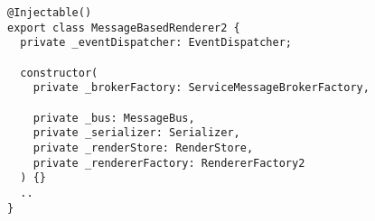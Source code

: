 \begin{verbatim}
@Injectable()
export class MessageBasedRenderer2 {
  private _eventDispatcher: EventDispatcher;

  constructor(
    private _brokerFactory: ServiceMessageBrokerFactory,

    private _bus: MessageBus,
    private _serializer: Serializer,
    private _renderStore: RenderStore,
    private _rendererFactory: RendererFactory2
  ) {}
  ..
}
\end{verbatim}
